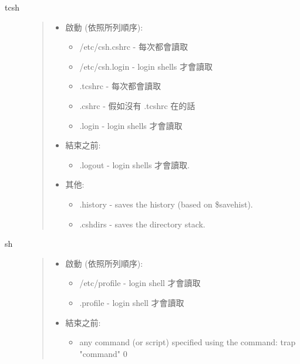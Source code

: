 \documentclass{article}
\begin{document}
\begin{CJK*}{Bg5}{ming}
\begin{description}
      \item[tcsh]
\begin{quote}
	\begin{itemize}
	  \item 啟動 (依照所列順序):
	  \begin{itemize}
             \item /etc/csh.cshrc - 每次都會讀取
             \item /etc/csh.login - login shells 才會讀取
             \item .tcshrc        - 每次都會讀取
             \item .cshrc         - 假如沒有 .tcshrc 在的話
             \item .login         - login shells 才會讀取
	  \end{itemize}

	  \item 結束之前:
	  \begin{itemize}
             \item .logout        - login shells 才會讀取.
	  \end{itemize}

	  \item 其他:
	  \begin{itemize}
             \item .history       - saves the history (based on \$savehist).
             \item .cshdirs       - saves the directory stack.
	  \end{itemize}
	\end{itemize}
\end{quote}

      \item[sh]
\begin{quote}
	\begin{itemize}
          \item 啟動 (依照所列順序):
	  \begin{itemize}
             \item /etc/profile - login shell 才會讀取
             \item .profile     - login shell 才會讀取
	  \end{itemize}

          \item 結束之前:
	  \begin{itemize}
             \item any command (or script) specified using the command:
                 trap "command" 0
	  \end{itemize}
	\end{itemize}
\end{quote}


\end{description}
\end{CJK*}
\end{document}
